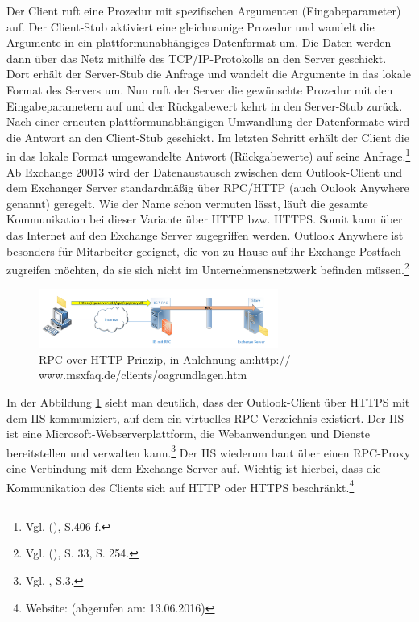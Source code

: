 \noindent 
Der Client ruft eine Prozedur mit spezifischen Argumenten (Eingabeparameter) auf. Der Client-Stub aktiviert eine gleichnamige Prozedur und wandelt die Argumente in ein plattformunabhängiges Datenformat um. Die Daten werden dann über das Netz mithilfe des TCP/IP-Protokolls an den Server geschickt. Dort erhält der Server-Stub die Anfrage und wandelt die Argumente in das lokale Format des Servers um. Nun ruft der Server die gewünschte Prozedur mit den Eingabeparametern auf und der Rückgabewert kehrt in den Server-Stub zurück. Nach einer erneuten plattformunabhängigen Umwandlung der Datenformate wird die Antwort an den Client-Stub geschickt. Im letzten Schritt erhält der Client die in das lokale Format umgewandelte Antwort (Rückgabewerte) auf seine Anfrage.\footnote{Vgl. \citeauthor{Schneider} (\citeyear{Schneider}), S.406 f.}\newline
Ab Exchange 20013 wird der Datenaustausch zwischen dem Outlook-Client und dem Exchanger Server standardmäßig über RPC/HTTP (auch Oulook Anywhere genannt) geregelt. Wie der Name schon vermuten lässt, läuft die gesamte Kommunikation bei dieser Variante über HTTP bzw. HTTPS. Somit kann über das Internet auf den Exchange Server zugegriffen werden. Outlook Anywhere ist besonders für Mitarbeiter geeignet, die von zu Hause auf ihr Exchange-Postfach zugreifen möchten, da sie sich nicht im Unternehmensnetzwerk befinden müssen.\footnote{Vgl. \citeauthor{Joos} (\citeyear{Joos}), S. 33, S. 254.}

\begin{figure}[h!]
\centering
\includegraphics[width=0.70\textwidth]{Abbildungen/RPC_HTTP.png}
	\caption[RPC over HTTP Prinzip]{RPC over HTTP Prinzip,  in Anlehnung an:http://
	www.msxfaq.de/clients/oagrundlagen.htm}
	\label{fig:RPC_HTTP}
\end{figure}

\noindent
In der Abbildung \ref{fig:RPC_HTTP} sieht man deutlich, dass der Outlook-Client über HTTPS mit dem IIS kommuniziert, auf dem ein virtuelles RPC-Verzeichnis existiert. Der IIS ist eine Microsoft-Webserverplattform, die Webanwendungen und Dienste bereitstellen und verwalten kann.\footnote{Vgl. \citeauthor{Volodarsky} \citeyear{Volodarsky}, S.3.} Der IIS wiederum baut über einen RPC-Proxy eine Verbindung mit dem Exchange Server auf. Wichtig ist hierbei, dass die Kommunikation des Clients sich auf HTTP oder HTTPS beschränkt.\footnote{Website:  \citeauthor{MSXoutlook} (abgerufen am: 13.06.2016)}


